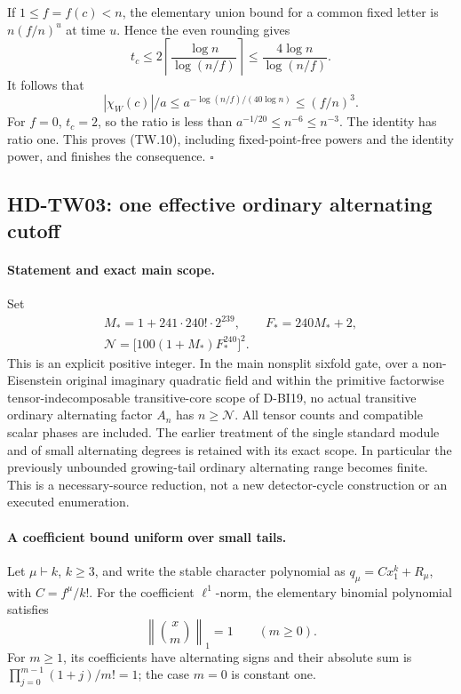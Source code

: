 If \(1\le f=f(c)<n\), the elementary union bound for a common fixed letter
is \(n(f/n)^u\) at time \(u\).  Hence the even rounding gives
\[
 t_c\le2\left\lceil\frac{\log n}{\log(n/f)}\right\rceil
 \le\frac{4\log n}{\log(n/f)} .
 \tag{TW.18}
\]
It follows that
\[
 |\chi_W(c)|/a
 \le a^{-\log(n/f)/(40\log n)}
 \le (f/n)^3 .
 \tag{TW.19}
\]
For \(f=0\), \(t_c=2\), so the ratio is less than
\(a^{-1/20}\le n^{-6}\le n^{-3}\).
The identity has ratio one.  This proves (TW.10), including fixed-point-free
powers and the identity power, and finishes the consequence. \(\square\)

\subsection{HD-TW03: one effective ordinary alternating cutoff}
\paragraph{Statement and exact main scope.}
Set
\[
 \begin{gathered}
 M_* = 1+241\cdot240!\cdot2^{239},\qquad
 F_* = 240M_*+2,\\
 \mathcal N=\bigl[100(1+M_*)F_*^{240}\bigr]^2 .
 \end{gathered}\tag{TW.20}
\]
This is an explicit positive integer.  In the main nonsplit sixfold gate,
over a non-Eisenstein original imaginary quadratic field and within
the primitive factorwise tensor-indecomposable transitive-core scope
of D-BI19, no actual transitive ordinary alternating factor \(A_n\) has \(n\ge\mathcal N\).
All tensor counts and compatible scalar phases are included.
The earlier treatment of the single standard module and of small
alternating degrees is retained with its exact scope.
In particular the previously unbounded growing-tail ordinary alternating
range becomes finite.  This is a necessary-source reduction, not a new
detector-cycle construction or an executed enumeration.

\paragraph{A coefficient bound uniform over small tails.}
Let \(\mu\vdash k\), \(k\ge3\), and write the stable character polynomial as
\(q_\mu=Cx_1^k+R_\mu\), with \(C=f^\mu/k!\).
For the coefficient \(\ell^1\)-norm, the elementary binomial polynomial
satisfies
\[
 \left\|\binom{x}{m}\right\|_1=1\qquad(m\ge0).
 \tag{TW.21}
\]
For \(m\ge1\), its coefficients have alternating signs and their absolute
sum is
\(\prod_{j=0}^{m-1}(1+j)/m!=1\); the case \(m=0\) is constant one.

